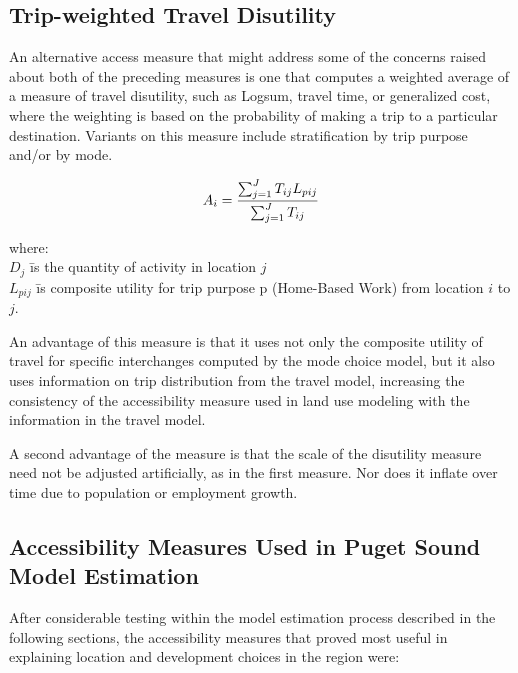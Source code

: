 \subsection{Trip-weighted Travel Disutility}

An alternative access measure that might address some of the
concerns raised about both of the preceding measures is one that
computes a weighted average of a measure of travel disutility,
such as Logsum, travel time, or generalized cost, where the
weighting is based on the probability of making a trip to a
particular destination.  Variants on this measure include
stratification by trip purpose and/or by mode.

\begin{equation}
A_i = {\sum_{j=1}^{J} T_{ij} L_{pij} \over \sum_{j=1}^{J} T_{ij}}
\end{equation}

\begin{tabbing}

where: \= \\
\> $D_j$ \= is the quantity of activity in location $j$ \\

\> $L_{pij}$ \=is composite utility for trip purpose p (Home-Based
Work) from location $i$ to $j$.

\end{tabbing}

An advantage of this measure is that it uses not only the
composite utility of travel for specific interchanges computed by
the mode choice model, but it also uses information on trip
distribution from the travel model, increasing the consistency of
the accessibility measure used in land use modeling with the
information in the travel model.

A second advantage of the measure is that the scale of the
disutility measure need not be adjusted artificially, as in the
first measure.  Nor does it inflate over time due to population or
employment growth.

\subsection{Accessibility Measures Used in Puget Sound Model Estimation}

After considerable testing within the model estimation process
described in the following sections, the accessibility measures
that proved most useful in explaining location and development
choices in the region were:

